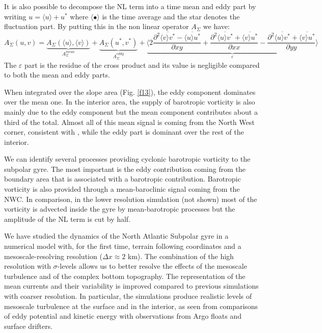 \documentclass[os, manuscript]{copernicus}
\begin{document}
It is also possible to decompose the NL term into a time mean and eddy part by writing $u = \langle u \rangle + u^*$ where $\langle \bullet\rangle$ is the time average and the star denotes the fluctuation part. By putting this in the non linear operator $A_{\Sigma}$ we have:
\begin{equation}
A_{\Sigma}(u,v)=\underbrace{A_{\Sigma}(\langle u \rangle, \langle v \rangle)}_{A_{\Sigma}^{mean}} + \underbrace{A_{\Sigma}(u^*,v^*)}_{A_{\Sigma}^{eddy}} +\underbrace{\langle  2\frac{\partial ^2 \overline{\langle v \rangle v^*} -\overline{\langle u \rangle u^*}}{\partial xy} +\frac{\partial ^2 \overline{\langle u \rangle v^*} + \overline{\langle v \rangle u^*}}{\partial xx} - \frac{\partial ^2 \overline{\langle u \rangle v^*} +\overline{ \langle v \rangle u^*}}{\partial yy}\rangle}_{\varepsilon}
\end{equation}
The $\varepsilon$ part is the residue of the cross product and its value is negligible compared to both the mean and eddy parts. 

When integrated over the slope area (Fig. \ref{f13}), the eddy component dominates over the mean one. In the interior area, the supply of barotropic vorticity is also mainly due to the eddy component but the mean component contributes about a third of the total. Almost all of this mean signal is coming from the North West corner, consistent with \citet{wang2017}, while the eddy part is dominant over the rest of the interior. 

We can identify several processes providing cyclonic barotropic vorticity to the subpolar gyre. The most important is the eddy contribution coming from the boundary area that is associated with a barotropic contribution. Barotropic vorticity is also provided through a mean-baroclinic signal coming from the NWC. In comparison, in the lower resolution simulation (not shown) most of the vorticity is advected inside the gyre by mean-barotropic processes but the amplitude of the NL term is cut by half.


We have studied the dynamics of the North Atlantic Subpolar gyre in a numerical model with, for the first time, terrain following coordinates and a mesoscale-resolving resolution ($\Delta x \approx 2$ km). The combination of the high resolution with $\sigma$-levels allows us to better resolve the effects of the mesoscale turbulence and of the complex bottom topography. The representation of the mean currents and their variability is improved compared to previous simulations with coarser resolution. In particular, the simulations produce realistic levels of mesoscale turbulence at the surface and in the interior, as seen from comparisons of eddy potential and kinetic energy with observations from Argo floats and surface drifters.
\end{document}
